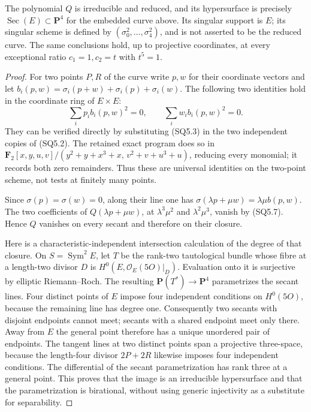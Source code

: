 \begin{proposition}
\label{prop:prime-five-supersingular-secant-polar}
The polynomial \(Q\) is irreducible and reduced, and its hypersurface
is precisely \(\operatorname{Sec}(E)\subset\mathbf P^4\) for the
embedded curve above. Its singular support is \(E\); its singular
scheme is defined by \((\sigma_0^2,\ldots,\sigma_4^2)\), and is
not asserted to be the reduced curve.
The same conclusions hold, up to projective coordinates, at every
exceptional ratio \(c_1=1,c_2=t\) with \(t^5=1\).
\end{proposition}
\begin{proof}
For two points \(P,R\) of the curve write \(p,w\) for their
coordinate vectors and let
\(b_i(p,w)=\sigma_i(p+w)+\sigma_i(p)+\sigma_i(w)\).
The following two identities hold in the coordinate ring of
\(E\times E\):
\[
                   \sum_i p_i b_i(p,w)^2=0,
          \qquad   \sum_i w_i b_i(p,w)^2=0.         \tag{SQ5.7}
\]
They can be verified directly by substituting (SQ5.3) in the
two independent copies of (SQ5.2). The retained exact program
does so in
\(\mathbf F_2[x,y,u,v]/(y^2+y+x^3+x,\,v^2+v+u^3+u)\),
reducing every monomial; it records both zero remainders.
Thus these are universal identities on the two-point scheme,
not tests at finitely many points.

Since \(\sigma(p)=\sigma(w)=0\), along their line one has
\(\sigma(\lambda p+\mu w)=\lambda\mu b(p,w)\).
The two coefficients of
\(Q(\lambda p+\mu w)\), at \(\lambda^3\mu^2\) and
\(\lambda^2\mu^3\), vanish by (SQ5.7). Hence \(Q\) vanishes
on every secant and therefore on their closure.

Here is a characteristic-independent intersection calculation of
the degree of that closure. On \(S=\operatorname{Sym}^2E\),
let \(T\) be the rank-two tautological bundle whose fibre at a
length-two divisor \(D\) is \(H^0(E,\mathcal O_E(5O)|_D)\).
Evaluation onto it is surjective by elliptic Riemann--Roch.
The resulting \(\mathbf P(T^*)\to\mathbf P^4\) parametrizes
the secant lines. Four distinct points of \(E\) impose four
independent conditions on \(H^0(5O)\), because the remaining
line has degree one. Consequently two secants with disjoint
endpoints cannot meet; secants with a shared endpoint meet only
there. Away from \(E\) the general point therefore has a
unique unordered pair of endpoints. The tangent lines at two
distinct points span a projective three-space, because the
length-four divisor \(2P+2R\) likewise imposes four independent
conditions. The differential of the secant parametrization has
rank three at a general point. This proves that the image is an
irreducible hypersurface and that the parametrization is
birational, without using generic injectivity as a substitute
for separability.


\end{proof}
